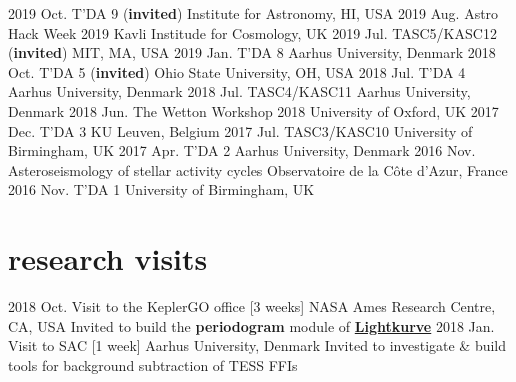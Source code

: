 \documentclass[]{k-cv} %
\begin{document}
\begin{entrylist}
\entrythree
{2019 Oct.}
{T'DA 9 (\textbf{\textcolor{c3}{invited}})}
{Institute for Astronomy, HI, USA}
\entrythree
{2019 Aug.}
{Astro Hack Week 2019}
{Kavli Institude for Cosmology, UK}
\entrythree
{2019 Jul.}
{TASC5/KASC12  (\textbf{\textcolor{c3}{invited}})}
{MIT, MA, USA}
\entrythree
{2019 Jan.}
{T'DA 8}
{Aarhus University, Denmark}
\entrythree
{2018 Oct.}
{T'DA 5 (\textbf{\textcolor{c3}{invited}})}
{Ohio State University, OH, USA}
\entrythree
{2018 Jul.}
{T'DA 4}
{Aarhus University, Denmark}
\entrythree
{2018 Jul.}
{TASC4/KASC11}
{Aarhus University, Denmark}
\entrythree
{2018 Jun.}
{The Wetton Workshop 2018}
{University of Oxford, UK}
\entrythree
{2017 Dec.}
{T'DA 3}
{KU Leuven, Belgium}
\entrythree
{2017 Jul.}
{TASC3/KASC10}
{University of Birmingham, UK}
\entrythree
{2017 Apr.}
{T'DA 2}
{Aarhus University, Denmark}
\entrythree
{2016 Nov.}
{Asteroseismology of stellar activity cycles}
{Observatoire de la C\^{o}te d'Azur, France}
\entrythree
{2016 Nov.}
{T'DA 1}
{University of Birmingham, UK}
\end{entrylist}


\section{\color{c4}research visits}
\begin{entrylist}
\entry
{2018 Oct.}
{Visit to the KeplerGO office [3 weeks]}
{NASA Ames Research Centre, CA, USA}
{Invited to build the \textbf{\textcolor{c4}{periodogram}} module of \textbf{\textcolor{c4}{\href{http://docs.lightkurve.org/}{Lightkurve}}}}
\entry
{2018 Jan.}
{Visit to SAC [1 week]}
{Aarhus University, Denmark}
{Invited to investigate \& build tools for background subtraction of TESS FFIs}
\end{entrylist}
\end{document}
